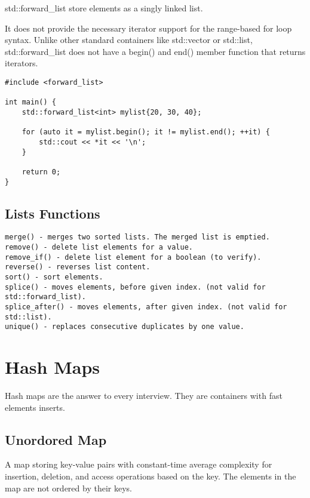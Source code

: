 \documentclass[openany]{report}
\begin{document}
std::forward\_list store elements as a singly linked list.

It does not provide the necessary iterator support for the range-based for loop syntax.
Unlike other standard containers like std::vector or std::list,
std::forward\_list does not have a begin() and end() member function that returns iterators.

\begin{verbatim}
#include <forward_list>

int main() {
    std::forward_list<int> mylist{20, 30, 40};

    for (auto it = mylist.begin(); it != mylist.end(); ++it) {
        std::cout << *it << '\n';
    }

    return 0;
}
\end{verbatim}

\subsection{Lists Functions}

\begin{verbatim}
merge() - merges two sorted lists. The merged list is emptied.
remove() - delete list elements for a value.
remove_if() - delete list element for a boolean (to verify).
reverse() - reverses list content.
sort() - sort elements.
splice() - moves elements, before given index. (not valid for std::forward_list).
splice_after() - moves elements, after given index. (not valid for std::list).
unique() - replaces consecutive duplicates by one value.
\end{verbatim}

\section{Hash Maps}

Hash maps are the answer to every interview. They are containers with fast elements inserts.

\subsection{Unordored Map}

A map storing key-value pairs with constant-time average complexity for insertion,
deletion, and access operations based on the key.
The elements in the map are not ordered by their keys.
\end{document}
